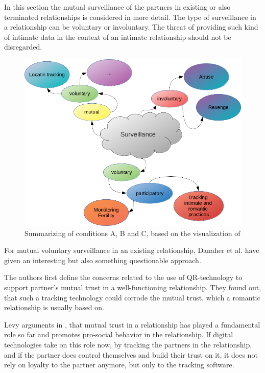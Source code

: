 In this section the mutual surveillance of the partners in existing or also terminated relationships is considered in more detail.
The type of surveillance in a relationship can be voluntary or involuntary. The threat of providing such kind of intimate data in the context of an intimate relationship should not be disregarded.
\begin{figure}[htb]
	\centering
	\includegraphics[width=\linewidth]{img/differences_surveillance.png}
	\caption{Summarizing of conditions A, B and C, based on the visualization of \cite{ethicsOfSurveillance}}
	\label{fig:intimate_surveillance}
\end{figure}
For mutual voluntary surveillance in an existing relationship, Danaher et al. \cite{doi:10.1080/15265161.2017.1409823} have given an interesting but also something questionable approach.

The authors first define the concerns related to the use of \acs{QR}-technology to support partner's mutual trust in a well-functioning relationship. They found out, that such a tracking technology could corrode the mutual trust, which a romantic relationship is usually based on.

Levy arguments in \cite{levy2014intimate}, that mutual trust in a relationship has played a fundamental role so far and promotes pro-social behavior in the relationship. If digital technologies take on this role now, by tracking the partners in the relationship, and if the partner does control themselves and build their trust on it, it does not rely on loyalty to the partner anymore, but only to the tracking software.

